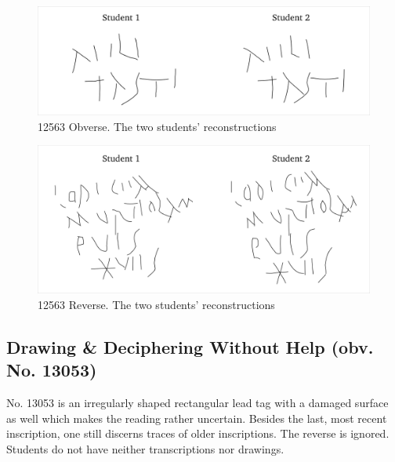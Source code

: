\documentclass[amsthm,ebook]{saparticle}
\begin{document}
\begin{figure}[!bp]
\centering
\includegraphics[scale=0.25]{EAGLE16lameetalteaching-img009.png}
\caption{12563 Obverse. The two students' reconstructions}
\label{fig:1}
\end{figure}

\begin{figure}[!bp]
\centering
\includegraphics[scale=0.25]{EAGLE16lameetalteaching-img008.png}
\caption{12563 Reverse. The two students' reconstructions}
\label{fig:2}
\end{figure}



\subsection{Drawing \& Deciphering Without Help (obv. No. 13053)}


No. 13053 is an irregularly shaped rectangular lead tag with a damaged surface as well which makes the reading rather
uncertain. Besides the last, most recent inscription, one still discerns traces of older inscriptions. The reverse is
ignored. Students do not have neither transcriptions nor drawings.

\end{document}
